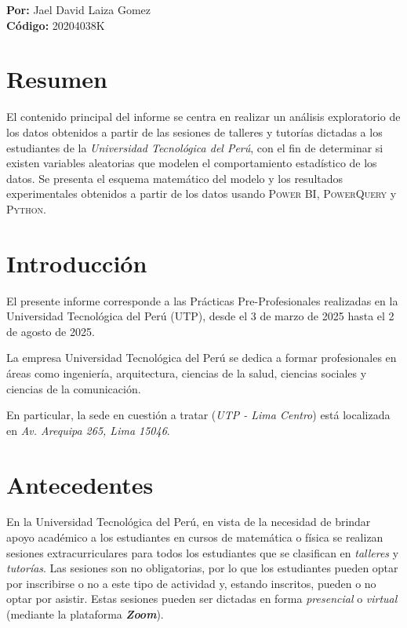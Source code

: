 \documentclass[11pt,a4paper]{book}
\theoremstyle{definition}%
\begin{document}
    \begin{center}
        \LARGE{\textbf{Por: }Jael David Laiza Gomez}\\
        \LARGE{\textbf{Código: }20204038K}
    \vspace{1cm}
    
    \date{\LARGE{\today}}
    \makeatletter
    \@date
    \makeatother
    \end{center}
    
    \tableofcontents

    \chapter*{Resumen}
        El contenido principal del informe se centra en realizar un análisis exploratorio de los datos obtenidos a partir de las sesiones de talleres y tutorías dictadas a los estudiantes de la \textit{Universidad Tecnológica del Perú}, con el fin de determinar si existen variables aleatorias que modelen el comportamiento estadístico de los datos. Se presenta el esquema matemático del modelo y los resultados experimentales obtenidos a partir de los datos usando \textsc{Power BI}, \textsc{PowerQuery} y \textsc{Python}.
    \chapter*{Introducción}
        El presente informe corresponde a las Prácticas Pre-Profesionales realizadas en la
        Universidad Tecnológica del Perú (UTP), desde el 3 de marzo de 2025 hasta el 2 de agosto de 2025.
        
        La empresa Universidad Tecnológica del Perú se dedica a formar profesionales en áreas como ingeniería, arquitectura, ciencias de la salud, ciencias sociales y ciencias de la comunicación.
        
        En particular, la sede en cuestión a tratar (\textit{UTP - Lima Centro}) está localizada en \textit{Av. Arequipa 265, Lima 15046}.
        
    \chapter*{Antecedentes}
        En la Universidad Tecnológica del Perú, en vista de la necesidad de brindar apoyo académico a los estudiantes en cursos de matemática o física se realizan sesiones extracurriculares para todos los estudiantes que se clasifican en \textit{talleres} y \textit{tutorías}. Las sesiones son no obligatorias, por lo que los estudiantes pueden optar por inscribirse o no a este tipo de actividad y, estando inscritos, pueden o no optar por asistir. Estas sesiones pueden ser dictadas en forma \textit{presencial} o \textit{virtual} (mediante la plataforma \textbf{\textit{Zoom}}).
        
\end{document}
